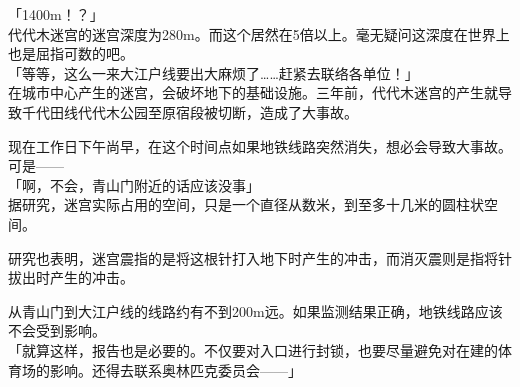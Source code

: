 「1400m！？」\\

代代木迷宫的迷宫深度为280m。而这个居然在5倍以上。毫无疑问这深度在世界上也是屈指可数的吧。\\

「等等，这么一来大江户线要出大麻烦了……赶紧去联络各单位！」\\

在城市中心产生的迷宫，会破坏地下的基础设施。三年前，代代木迷宫的产生就导致千代田线代代木公园至原宿段被切断，造成了大事故。

现在工作日下午尚早，在这个时间点如果地铁线路突然消失，想必会导致大事故。可是——\\

「啊，不会，青山门附近的话应该没事」\\

据研究，迷宫实际占用的空间，只是一个直径从数米，到至多十几米的圆柱状空间。

研究也表明，迷宫震指的是将这根针打入地下时产生的冲击，而消灭震则是指将针拔出时产生的冲击。

从青山门到大江户线的线路约有不到200m远。如果监测结果正确，地铁线路应该不会受到影响。\\

「就算这样，报告也是必要的。不仅要对入口进行封锁，也要尽量避免对在建的体育场的影响。还得去联系奥林匹克委员会——」

